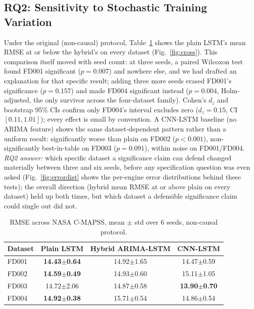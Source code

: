 \documentclass[conference]{IEEEtran}
\begin{document}
\subsection{RQ2: Sensitivity to Stochastic Training Variation}
Under the original (non-causal) protocol, Table~\ref{tab:main} shows the plain LSTM's mean RMSE at or below the hybrid's on every dataset (Fig.~\ref{fig:cross}). This comparison itself moved with seed count: at three seeds, a paired Wilcoxon test found FD001 significant ($p=0.007$) and nowhere else, and we had drafted an explanation for that specific result; adding three more seeds erased FD001's significance ($p=0.157$) and made FD004 significant instead ($p=0.004$, Holm-adjusted, the only survivor across the four-dataset family). Cohen's $d_z$ and bootstrap 95\% CIs confirm only FD004's interval excludes zero ($d_z=0.15$, CI $[0.11,1.01]$); every effect is small by convention. A CNN-LSTM baseline (no ARIMA feature) shows the same dataset-dependent pattern rather than a uniform result: significantly worse than plain on FD002 ($p<0.001$), non-significantly best-in-table on FD003 ($p=0.091$), within noise on FD001/FD004. \emph{RQ2 answer:} which specific dataset a significance claim can defend changed materially between three and six seeds, before any specification question was even asked (Fig.~\ref{fig:errordist} shows the per-engine error distributions behind these tests); the overall direction (hybrid mean RMSE at or above plain on every dataset) held up both times, but which dataset a defensible significance claim could single out did not.

\begin{table}[t]
\centering
\caption{RMSE across NASA C-MAPSS, mean $\pm$ std over 6 seeds, non-causal protocol.}
\label{tab:main}
\footnotesize
\begin{tabular}{lccc}
\toprule
Dataset & Plain LSTM & Hybrid ARIMA-LSTM & CNN-LSTM \\
\midrule
FD001 & \textbf{14.43{\tiny$\pm$0.64}} & 14.92{\tiny$\pm$1.65} & 14.47{\tiny$\pm$0.59} \\
FD002 & \textbf{14.59{\tiny$\pm$0.49}} & 14.93{\tiny$\pm$0.60} & 15.11{\tiny$\pm$1.05} \\
FD003 & 14.72{\tiny$\pm$2.06} & 14.87{\tiny$\pm$0.58} & \textbf{13.90{\tiny$\pm$0.70}} \\
FD004 & \textbf{14.92{\tiny$\pm$0.38}} & 15.71{\tiny$\pm$0.54} & 14.86{\tiny$\pm$0.54} \\
\bottomrule
\end{tabular}
\end{table}
\end{document}
